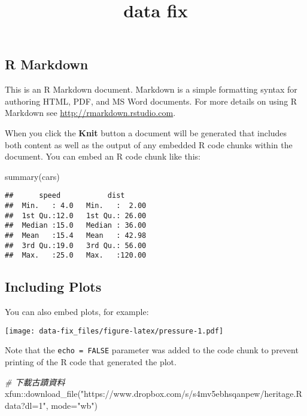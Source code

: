 \documentclass[
]{article}
\title{data fix}
\author{}
\date{\vspace{-2.5em}}
\newenvironment{Shaded}{\begin{snugshade}}{\end{snugshade}}
\newcommand{\AttributeTok}[1]{\textcolor[rgb]{0.77,0.63,0.00}{#1}}
\newcommand{\CommentTok}[1]{\textcolor[rgb]{0.56,0.35,0.01}{\textit{#1}}}
\newcommand{\FunctionTok}[1]{\textcolor[rgb]{0.00,0.00,0.00}{#1}}
\newcommand{\NormalTok}[1]{#1}
\newcommand{\SpecialCharTok}[1]{\textcolor[rgb]{0.00,0.00,0.00}{#1}}
\newcommand{\StringTok}[1]{\textcolor[rgb]{0.31,0.60,0.02}{#1}}
\begin{document}
\maketitle

\hypertarget{r-markdown}{%
\subsection{R Markdown}\label{r-markdown}}

This is an R Markdown document. Markdown is a simple formatting syntax
for authoring HTML, PDF, and MS Word documents. For more details on
using R Markdown see \url{http://rmarkdown.rstudio.com}.

When you click the \textbf{Knit} button a document will be generated
that includes both content as well as the output of any embedded R code
chunks within the document. You can embed an R code chunk like this:

\begin{Shaded}
\begin{Highlighting}[]
\FunctionTok{summary}\NormalTok{(cars)}
\end{Highlighting}
\end{Shaded}

\begin{verbatim}
##      speed           dist       
##  Min.   : 4.0   Min.   :  2.00  
##  1st Qu.:12.0   1st Qu.: 26.00  
##  Median :15.0   Median : 36.00  
##  Mean   :15.4   Mean   : 42.98  
##  3rd Qu.:19.0   3rd Qu.: 56.00  
##  Max.   :25.0   Max.   :120.00
\end{verbatim}

\hypertarget{including-plots}{%
\subsection{Including Plots}\label{including-plots}}

You can also embed plots, for example:

\texttt{[image: data-fix\_files/figure-latex/pressure-1.pdf]}

Note that the \texttt{echo\ =\ FALSE} parameter was added to the code
chunk to prevent printing of the R code that generated the plot.

\begin{Shaded}
\begin{Highlighting}[]
\CommentTok{\# 下載古蹟資料}
\NormalTok{xfun}\SpecialCharTok{::}\FunctionTok{download\_file}\NormalTok{(}\StringTok{"https://www.dropbox.com/s/s4mv5ebhsqanpew/heritage.Rdata?dl=1"}\NormalTok{, }\AttributeTok{mode=}\StringTok{"wb"}\NormalTok{)}
\end{Highlighting}
\end{Shaded}
\end{document}
